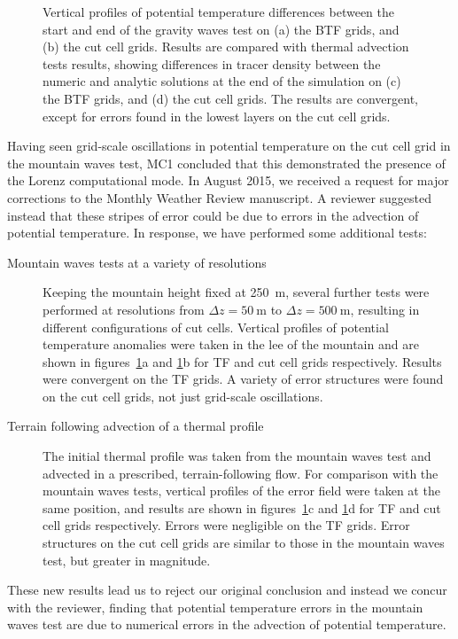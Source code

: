 \documentclass[a4paper]{article}
\begin{document}
\begin{figure}
	\centering
	\footnotesize
	
%
	\caption{Vertical profiles of potential temperature differences between the start and end of the gravity waves test on (a) the BTF grids, and (b) the cut cell grids.  Results are compared with thermal advection tests results, showing differences in tracer density between the numeric and analytic solutions at the end of the simulation on (c) the BTF grids, and (d) the cut cell grids.  The results are convergent, except for errors found in the lowest layers on the cut cell grids.}
	\label{fig:sampleLines}
\end{figure}

Having seen grid-scale oscillations in potential temperature on the cut cell grid in the mountain waves test, MC1 concluded that this demonstrated the presence of the Lorenz computational mode.  In August 2015, we received a request for major corrections to the Monthly Weather Review manuscript.  A reviewer suggested instead that these stripes of error could be due to errors in the advection of potential temperature.
In response, we have performed some additional tests:
\begin{description}
	\item[Mountain waves tests at a variety of resolutions]{Keeping the mountain height fixed at \SI{250}{\meter}, several further tests were performed at resolutions from $\Delta z = \SI{50}{\meter}$ to $\Delta z = \SI{500}{\meter}$, resulting in different configurations of cut cells.  Vertical profiles of potential temperature anomalies were taken in the lee of the mountain and are shown in figures~\ref{fig:sampleLines}a and \ref{fig:sampleLines}b for TF and cut cell grids respectively.  Results were convergent on the TF grids.  A variety of error structures were found on the cut cell grids, not just grid-scale oscillations.}
	\item[Terrain following advection of a thermal profile]{The initial thermal profile was taken from the mountain waves test and advected in a prescribed, terrain-following flow.  For comparison with the mountain waves tests, vertical profiles of the error field were taken at the same position, and results are shown in figures~\ref{fig:sampleLines}c and \ref{fig:sampleLines}d for TF and cut cell grids respectively.  Errors were negligible on the TF grids.  Error structures on the cut cell grids are similar to those in the mountain waves test, but greater in magnitude.}
\end{description}
These new results lead us to reject our original conclusion and instead we concur with the reviewer, finding that potential temperature errors in the mountain waves test are due to numerical errors in the advection of potential temperature.
\end{document}
